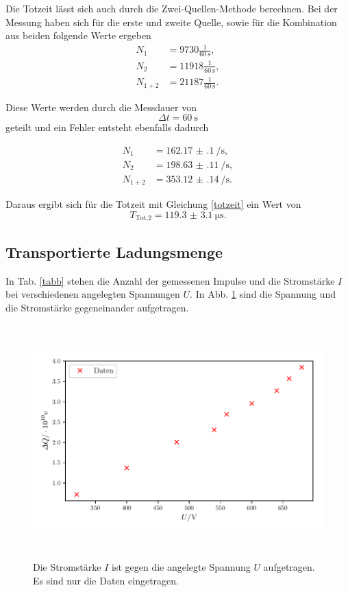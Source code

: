 \noindent Die Totzeit lässt sich auch durch die Zwei-Quellen-Methode berechnen. 
Bei der Messung haben sich für die erste und zweite Quelle, sowie für die Kombination aus beiden folgende Werte ergeben
\begin{align*} 
   N_1 &= 9730 \frac{1}{\SI{60}{\second}},\\
   N_2 &= 11918 \frac{1}{\SI{60}{\second}}, \\
   N_{1+2} &= 21187 \frac{1}{\SI{60}{\second}}.
\end{align*}

\noindent Diese Werte werden durch die Messdauer von
\begin{equation*}
    \Delta t = \SI{60}{\second}
\end{equation*}
geteilt und ein Fehler entsteht ebenfalls dadurch %

\begin{align*} 
   N_1 &= \SI{162.17(10)}{\per\second},\\
   N_2 &= \SI{198.63(11)}{\per\second}, \\
   N_{1+2} &=\SI{353.12(14)}{\per\second}.
\end{align*}

\noindent Daraus ergibt sich für die Totzeit mit Gleichung \eqref{totzeit}
ein Wert von 
\begin{equation*} 
    T_\text{Tot,2} = \SI{119.3(31)}{\micro\second}.
\end{equation*} 

\subsection{Transportierte Ladungsmenge}
In Tab. \ref{tabb} stehen die Anzahl der gemessenen Impulse und die Stromstärke $I$ bei verschiedenen angelegten Spannungen $U$.
In Abb. \ref{fig2} sind die Spannung und die Stromstärke gegeneinander aufgetragen. 



\begin{figure}
    \centering
    \includegraphics[width=15cm, height=9cm]{build/plot2.pdf}
    \caption{Die Stromstärke $I$ ist gegen die angelegte Spannung $U$ aufgetragen. Es sind nur die Daten eingetragen.}
    \label{fig2}
\end{figure}

